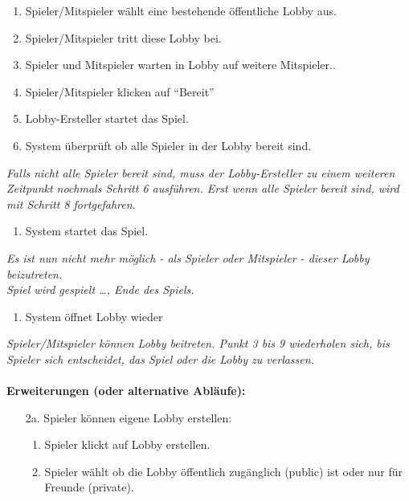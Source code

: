 \documentclass[11pt,ngerman]{article}
\newcommand{\quotes}[1]{``#1''}
\begin{document}
\begin{tcolorbox}
\begin{enumerate}
                        \item Spieler/Mitspieler wählt eine bestehende öffentliche \Gls{Lobby} aus.
                        \item Spieler/Mitspieler tritt diese \Gls{Lobby} bei.
                        \item Spieler und Mitspieler warten in \Gls{Lobby} auf weitere Mitspieler..
                        \item Spieler/Mitspieler klicken auf \quotes{Bereit}
                        \item Lobby-Ersteller startet das Spiel.
                        \item System überprüft ob alle Spieler in der \Gls{Lobby} bereit sind.
                    \end{enumerate}
                    \textit{Falls nicht alle Spieler bereit sind, muss der Lobby-Ersteller zu einem weiteren Zeitpunkt nochmals Schritt 6 ausführen. Erst wenn alle Spieler bereit sind, wird mit Schritt 8 fortgefahren.}
                    \begin{enumerate}[resume]
                        \item System startet das Spiel.
                    \end{enumerate}
                    \textit{Es ist nun nicht mehr möglich - als Spieler oder Mitspieler - dieser \Gls{Lobby} beizutreten.} \\
                    \textit{Spiel wird gespielt …, Ende des Spiels.}
                    \begin{enumerate}[resume]
                        \item System öffnet \Gls{Lobby} wieder
                    \end{enumerate}
                    \textit{Spieler/Mitspieler können \Gls{Lobby} beitreten. Punkt 3 bis 9 wiederholen sich, bis Spieler sich entscheidet, das Spiel oder die \Gls{Lobby} zu verlassen.} \\
                    \\ \textbf{Erweiterungen (oder alternative Abläufe):}
                    \begin{itemize}
                        \item[2a.] Spieler können eigene \Gls{Lobby} erstellen:
                        \begin{enumerate}
                            \item Spieler klickt auf \Gls{Lobby} erstellen.
                            \item Spieler wählt ob die \Gls{Lobby} öffentlich zugänglich (public) ist oder nur für Freunde (private).

\end{enumerate}
\end{itemize}
\end{tcolorbox}
\end{document}
